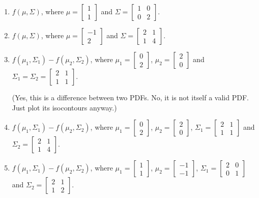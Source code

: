 \documentclass[11pt]{article}
\begin{document}
	\begin{enumerate}
		\item $f(\mu,\Sigma)$, where $\mu = \begin{bmatrix} 1 \\ 1\end{bmatrix}$ and $\Sigma = \begin{bmatrix} 1 & 0\\ 0 & 2 \end{bmatrix}$.

		\item $f(\mu,\Sigma)$, where $\mu = \begin{bmatrix} -1 \\ 2\end{bmatrix}$ and $\Sigma = \begin{bmatrix} 2 & 1\\ 1 & 4 \end{bmatrix}$.
		\item $f(\mu_1,\Sigma_1)-f(\mu_2,\Sigma_2)$, where $\mu_1 = \begin{bmatrix} 0 \\ 2\end{bmatrix}$, $\mu_2 = \begin{bmatrix} 2 \\ 0\end{bmatrix}$ and $\Sigma_1 = \Sigma_2 = \begin{bmatrix} 2 & 1\\ 1 & 1 \end{bmatrix}$.
		
		(Yes, this is a difference between two PDFs. No, it is not itself a valid PDF. Just plot its isocontours anyway.)
		\item $f(\mu_1,\Sigma_1)-f(\mu_2,\Sigma_2)$, where $\mu_1 = \begin{bmatrix} 0 \\ 2\end{bmatrix}$, $\mu_2 = \begin{bmatrix} 2 \\ 0\end{bmatrix}$, $\Sigma_1 = \begin{bmatrix} 2 & 1\\ 1 & 1 \end{bmatrix}$ and $\Sigma_2 = \begin{bmatrix} 2 & 1\\ 1 & 4 \end{bmatrix}$.
		\item $f(\mu_1,\Sigma_1)-f(\mu_2,\Sigma_2)$, where $\mu_1 = \begin{bmatrix} 1 \\ 1\end{bmatrix}$, $\mu_2 = \begin{bmatrix} -1 \\ -1\end{bmatrix}$, $\Sigma_1 = \begin{bmatrix} 2 & 0\\ 0 & 1 \end{bmatrix}$ and $\Sigma_2 = \begin{bmatrix} 2 & 1\\ 1 & 2 \end{bmatrix}$.
		

\end{enumerate}
\end{document}
